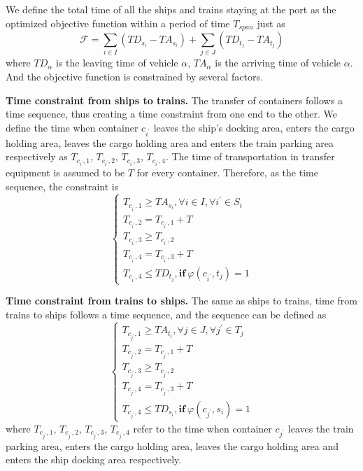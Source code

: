 \documentclass{mcmthesis}
\begin{document}
We define the total time of all the ships and trains staying at the port as the optimized objective function within a period of time $T_{span}$ just as
\begin{equation}
    \mathscr{F} = \sum_{i \in I}(TD_{s_i}-TA_{s_i}) + \sum_{j \in J}(TD_{t_j}-TA_{t_j})
\end{equation}
where $TD_{\alpha}$ is the leaving time of vehicle $\alpha$, $TA_{\alpha}$ is the arriving time of vehicle $\alpha$. And the objective function is constrained by several factors.\cite{8}

\textbf{Time constraint from ships to trains.} The transfer of containers follows a time sequence, thus creating a time constraint from one end to the other. We define the time when container $c_{i^{\prime}}$ leaves the ship's docking area, enters the cargo holding area,  leaves the cargo holding area and enters the train parking area respectively as $T_{c_{i^{\prime}},1}$, $T_{c_{i^{\prime}},2}$, $T_{c_{i^{\prime}},3}$, $T_{c_{i^{\prime}},4}$. The time of transportation in transfer equipment is assumed to be $T$ for every container. Therefore, as the time sequence,  the constraint is
\begin{equation}
    \begin{cases}
    T_{c_{i^{\prime}},1} \geq TA_{s_i}, \forall i \in I, \forall i^{\prime} \in S_i\\
    T_{c_{i^{\prime}},2} = T_{c_{i^{\prime}},1}+T\\
    T_{c_{i^{\prime}},3} \geq T_{c_{i^{\prime}},2} \\
    T_{c_{i^{\prime}},4} = T_{c_{i^{\prime}},3}+T\\
    T_{c_{i^{\prime}},4} \leq TD_{t_j}, \mathbf{if}\   \varphi(c_{i^{\prime}},t_j) = 1 
    \end{cases}
\end{equation}

\textbf{Time constraint from trains to ships.} The same as ships to trains, time  from trains to ships follows a time sequence, and the sequence can be defined as 
\begin{equation}
    \begin{cases}
    T_{c_{j^{\prime}},1} \geq TA_{t_i}, \forall j \in J, \forall j^{\prime} \in T_j\\
    T_{c_{j^{\prime}},2} = T_{c_{j^{\prime}},1}+T\\
    T_{c_{j^{\prime}},3} \geq T_{c_{j^{\prime}},2} \\
    T_{c_{j^{\prime}},4} = T_{c_{j^{\prime}},3}+T\\
    T_{c_{j^{\prime}},4} \leq TD_{s_i}, \mathbf{if}\   \varphi(c_{j^{\prime}},s_i) = 1 
    \end{cases}
\end{equation}
where $T_{c_{j^{\prime}},1}$, $T_{c_{j^{\prime}},2}$, $T_{c_{j^{\prime}},3}$, $T_{c_{j^{\prime}},4}$ refer to the time when container $c_{j^{\prime}}$ leaves the train parking area, enters the cargo holding area,  leaves the cargo holding area and enters the ship docking area respectively.
\end{document}
